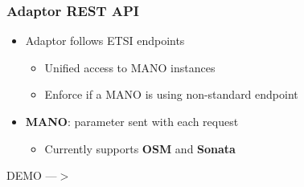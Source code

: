 \begin{frame}
\frametitle{Adaptor REST API}

\begin{itemize}[<+->]
				

	\item Adaptor follows ETSI endpoints
	\begin{itemize}
		\item Unified access to MANO instances
		\item Enforce if a MANO is using non-standard endpoint
	\end{itemize}
	
	\item \textbf{MANO}: parameter sent with each request
	\begin{itemize}
		\item Currently supports \textbf{OSM} and \textbf{Sonata}
	\end{itemize}
		
\end{itemize}
\end{frame}

\begin{frame}

\Huge{\centerline{DEMO ---$ > $}}

\end{frame}